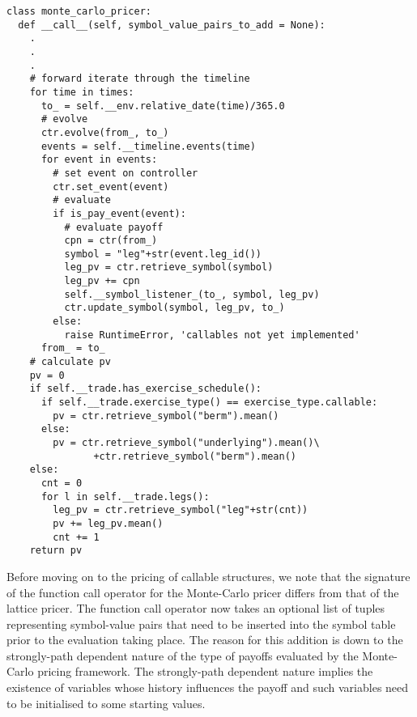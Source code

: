 \begin{verbatim}
class monte_carlo_pricer:
  def __call__(self, symbol_value_pairs_to_add = None):
    .
    .
    .
    # forward iterate through the timeline
    for time in times:
      to_ = self.__env.relative_date(time)/365.0
      # evolve
      ctr.evolve(from_, to_)
      events = self.__timeline.events(time)
      for event in events:
        # set event on controller
        ctr.set_event(event)
        # evaluate
        if is_pay_event(event):
          # evaluate payoff
          cpn = ctr(from_)
          symbol = "leg"+str(event.leg_id())
          leg_pv = ctr.retrieve_symbol(symbol) 
          leg_pv += cpn        
          self.__symbol_listener_(to_, symbol, leg_pv)
          ctr.update_symbol(symbol, leg_pv, to_)                      
        else:
          raise RuntimeError, 'callables not yet implemented'
      from_ = to_
    # calculate pv
    pv = 0
    if self.__trade.has_exercise_schedule():
      if self.__trade.exercise_type() == exercise_type.callable:
        pv = ctr.retrieve_symbol("berm").mean()
      else:
        pv = ctr.retrieve_symbol("underlying").mean()\
               +ctr.retrieve_symbol("berm").mean()
    else:
      cnt = 0
      for l in self.__trade.legs():
        leg_pv = ctr.retrieve_symbol("leg"+str(cnt)) 
        pv += leg_pv.mean()
        cnt += 1
    return pv
\end{verbatim}

Before moving on to the pricing of callable structures, we note that
the signature of the function call operator for the Monte-Carlo pricer
differs from that of the lattice pricer. The function call operator
now takes an optional list of tuples representing symbol-value pairs
that need to be inserted into the symbol table prior to the evaluation
taking place. The reason for this addition is down to the
strongly-path dependent nature of the type of payoffs evaluated by the
Monte-Carlo pricing framework. The strongly-path dependent nature
implies the existence of variables whose history influences the
payoff and such variables need to be initialised to some starting
values.

